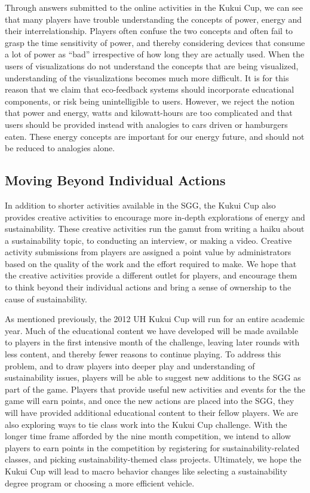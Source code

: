 \documentclass{sigchi}
\begin{document}
Through answers submitted to the online activities in the Kukui Cup, we can see that many players have trouble understanding the concepts of power, energy and their interrelationship. Players often confuse the two concepts and often fail to grasp the time sensitivity of power, and thereby considering devices that consume a lot of power as ``bad'' irrespective of how long they are actually used. When the users of visualizations do not understand the concepts that are being visualized, understanding of the visualizations becomes much more difficult. It is for this reason that we claim that eco-feedback systems should incorporate educational components, or risk being unintelligible to users. However, we reject the notion that power and energy, watts and kilowatt-hours are too complicated and that users should be provided instead with analogies to cars driven or hamburgers eaten. These energy concepts are important for our energy future, and should not be reduced to analogies alone.


\subsection{Moving Beyond Individual Actions}

In addition to shorter activities available in the SGG, the Kukui Cup also provides creative activities to encourage more in-depth explorations of energy and sustainability. These creative activities run the gamut from writing a haiku about a sustainability topic, to conducting an interview, or making a video. Creative activity submissions from players are assigned a point value by administrators based on the quality of the work and the effort required to make. We hope that the creative activities provide a different outlet for players, and encourage them to think beyond their individual actions and bring a sense of ownership to the cause of sustainability.

As mentioned previously, the 2012 UH Kukui Cup will run for an entire academic year. Much of the educational content we have developed will be made available to players in the first intensive month of the challenge, leaving later rounds with less content, and thereby fewer reasons to continue playing. To address this problem, and to draw players into deeper play and understanding of sustainability issues, players will be able to suggest new additions to the SGG as part of the game. Players that provide useful new activities and events for the the game will earn points, and once the new actions are placed into the SGG, they will have provided additional educational content to their fellow players. We are also exploring ways to tie class work into the Kukui Cup challenge. With the longer time frame afforded by the nine month competition, we intend to allow players to earn points in the competition by registering for sustainability-related classes, and picking sustainability-themed class projects. Ultimately, we hope the Kukui Cup will lead to macro behavior changes like selecting a sustainability degree program or choosing a more efficient vehicle.
\end{document}
